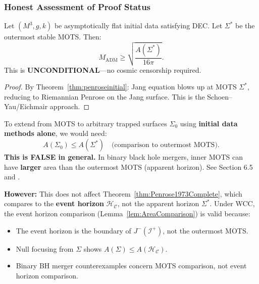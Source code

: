 \subsubsection{Honest Assessment of Proof Status}

\begin{theorem}\label{thm:motsproved}
Let $(M^3, g, k)$ be asymptotically flat initial data satisfying DEC. Let $\Sigma^*$ be the outermost stable MOTS. Then:
\begin{equation}
    \boxed{M_{\mathrm{ADM}} \geq \sqrt{\frac{A(\Sigma^*)}{16\pi}}.}
\end{equation}
This is \textbf{UNCONDITIONAL}---no cosmic censorship required.
\end{theorem}

\begin{proof}
By Theorem~\ref{thm:penroseinitial}: Jang equation blows up at MOTS $\Sigma^*$, reducing to Riemannian Penrose on the Jang surface. This is the Schoen--Yau/Eichmair approach.
\end{proof}

\begin{remark}\label{rmk:criticalgap}
To extend from MOTS to arbitrary trapped surfaces $\Sigma_0$ using \textbf{initial data methods alone}, we would need:
\begin{equation}
    A(\Sigma_0) \leq A(\Sigma^*) \quad \text{(comparison to outermost MOTS)}.
\end{equation}
\textbf{This is FALSE in general.} In binary black hole mergers, inner MOTS can have \textbf{larger} area than the outermost MOTS (apparent horizon). See Section 6.5 and \cite{jaramillo2011}.

\textbf{However:} This does not affect Theorem~\ref{thm:Penrose1973Complete}, which compares to the \textbf{event horizon} $\mathcal{H}_\mathcal{C}$, not the apparent horizon $\Sigma^*$. Under WCC, the event horizon comparison (Lemma~\ref{lem:AreaComparison}) is valid because:
\begin{itemize}
    \item The event horizon is the boundary of $J^-(\mathscr{I}^+)$, not the outermost MOTS.
    \item Null focusing from $\Sigma$ shows $A(\Sigma) \leq A(\mathcal{H}_\mathcal{C})$.
    \item Binary BH merger counterexamples concern MOTS comparison, not event horizon comparison.
\end{itemize}
\end{remark}

